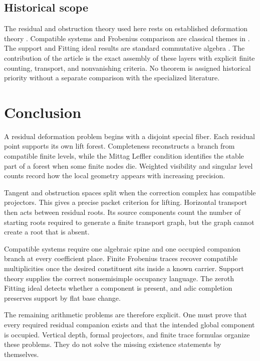 \documentclass{aomart}
\theoremstyle{definition}
\theoremstyle{remark}
\begin{document}
\subsection{Historical scope}

The residual and obstruction theory used here rests on established deformation theory \cite{Schlessinger1968,Mazur1989,Ramakrishna1993,Kisin2010}. Compatible systems and Frobenius comparison are classical themes in \cite{Serre1998,LarsenPink1992,BellaicheChenevier2009}. The support and Fitting ideal results are standard commutative algebra \cite{AtiyahMacdonald1969,Eisenbud1995,Matsumura1989}. The contribution of the article is the exact assembly of these layers with explicit finite counting, transport, and nonvanishing criteria. No theorem is assigned historical priority without a separate comparison with the specialized literature.

\section{Conclusion}\label{sec:conclusion}

A residual deformation problem begins with a disjoint special fiber. Each residual point supports its own lift forest. Completeness reconstructs a branch from compatible finite levels, while the Mittag Leffler condition identifies the stable part of a forest when some finite nodes die. Weighted visibility and singular level counts record how the local geometry appears with increasing precision.

Tangent and obstruction spaces split when the correction complex has compatible projectors. This gives a precise packet criterion for lifting. Horizontal transport then acts between residual roots. Its source components count the number of starting roots required to generate a finite transport graph, but the graph cannot create a root that is absent.

Compatible systems require one algebraic spine and one occupied companion branch at every coefficient place. Finite Frobenius traces recover compatible multiplicities once the desired constituent sits inside a known carrier. Support theory supplies the correct nonsemisimple occupancy language. The zeroth Fitting ideal detects whether a component is present, and adic completion preserves support by flat base change.

The remaining arithmetic problems are therefore explicit. One must prove that every required residual companion exists and that the intended global component is occupied. Vertical depth, formal projectors, and finite trace formulas organize these problems. They do not solve the missing existence statements by themselves.
\end{document}
